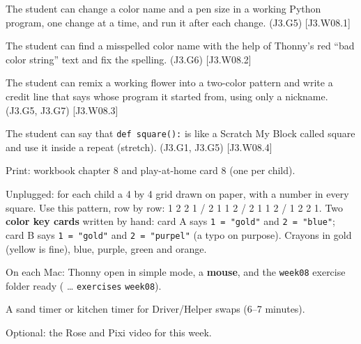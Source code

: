 
\begin{objectives}
  \item The student can change a color name and a pen size in a working Python program, one change at a time, and run it after each change. (J3.G5) [J3.W08.1]
  \item The student can find a misspelled color name with the help of Thonny's red \enquote{bad color string} text and fix the spelling. (J3.G6) [J3.W08.2]
  \item The student can remix a working flower into a two-color pattern and write a credit line that says whose program it started from, using only a nickname. (J3.G5, J3.G7) [J3.W08.3]
  \item The student can say that \texttt{def square():} is like a Scratch My Block called square and use it inside a repeat (stretch). (J3.G1, J3.G5) [J3.W08.4]
\end{objectives}

\begin{materials}
  \item Print: workbook chapter 8 and play-at-home card 8 (one per child).
  \item Unplugged: for each child a 4 by 4 grid drawn on paper, with a number in every square. Use this pattern, row by row: 1 2 2 1 / 2 1 1 2 / 2 1 1 2 / 1 2 2 1. Two \textbf{color key cards} written by hand: card A says \texttt{1 = "gold"} and \texttt{2 = "blue"}; card B says \texttt{1 = "gold"} and \texttt{2 = "purpel"} (a typo on purpose). Crayons in gold (yellow is fine), blue, purple, green and orange.
  \item On each Mac: Thonny open in simple mode, a \textbf{mouse}, and the \texttt{week08} exercise folder ready ( \textrightarrow{} \ldots{} \textrightarrow{} \texttt{exercises} \textrightarrow{} \texttt{week08}).
  \item A sand timer or kitchen timer for Driver/Helper swaps (6--7 minutes).
  \item Optional: the Rose and Pixi video for this week.
\end{materials}

